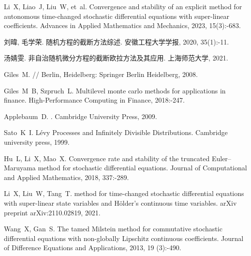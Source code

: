 \begin{thebibliography}{99}
    Li~X, Liao~J, Liu~W, et~al.
    \newblock Convergence and stability of an explicit method for autonomous
    time-changed stochastic differential equations with super-linear
    coefficients\allowbreak[J].
    \newblock Advances in Applied Mathematics and Mechanics, 2023{},
    15\allowbreak (3):-683.
    
    刘暐, 毛学荣.
    \newblock 随机方程的截断方法综述\allowbreak[J].
    \newblock 安徽工程大学学报, 2020, 35\allowbreak (1):-11.
    
    汤婧雯.
    \newblock
    非自治随机微分方程的截断欧拉方法及其应用\allowbreak[D].
    \newblock 上海师范大学, 2021.
    
    Giles~M.
    \allowbreak[M]//\allowbreak
    Berlin, Heidelberg: Springer Berlin Heidelberg, 2008.
    
    Giles~M~B, Szpruch~L.
    \newblock Multilevel monte carlo methods for applications in
    finance\allowbreak[J].
    \newblock High-Performance Computing in Finance, 2018:-247.
    
    Applebaum~D.
    \allowbreak[M].
    \newblock Cambridge University Press, 2009.
    
    Sato~K~I.
    \newblock L{\'e}vy {Processes and Infinitely Divisible
        Distributions}\allowbreak[M].
    \newblock Cambridge university press, 1999.
    
    Hu~L, Li~X, Mao~X.
    \newblock Convergence rate and stability of the truncated {Euler–Maruyama}
    method for stochastic differential equations\allowbreak[J].
    \newblock Journal of Computational and Applied Mathematics, 2018,
    337:-289.
    
    Li~X, Liu~W, Tang~T.
     method for time-changed stochastic
    differential equations with super-linear state variables and {H\"older's}
    continuous time variables\allowbreak[J].
    \newblock arXiv preprint arXiv:2110.02819, 2021.
    
    Wang~X, Gan~S.
    \newblock The tamed {Milstein} method for commutative stochastic differential
    equations with non-globally {Lipschitz} continuous
    coefficients\allowbreak[J].
    \newblock Journal of Difference Equations and Applications, 2013, 19\allowbreak
    (3):-490.
    
\end{thebibliography}

